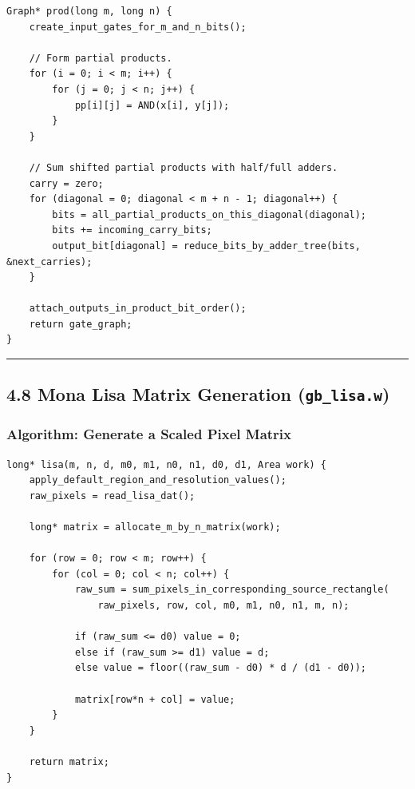 \documentclass[11pt]{article}
\begin{document}
\begin{verbatim}
Graph* prod(long m, long n) {
    create_input_gates_for_m_and_n_bits();

    // Form partial products.
    for (i = 0; i < m; i++) {
        for (j = 0; j < n; j++) {
            pp[i][j] = AND(x[i], y[j]);
        }
    }

    // Sum shifted partial products with half/full adders.
    carry = zero;
    for (diagonal = 0; diagonal < m + n - 1; diagonal++) {
        bits = all_partial_products_on_this_diagonal(diagonal);
        bits += incoming_carry_bits;
        output_bit[diagonal] = reduce_bits_by_adder_tree(bits, &next_carries);
    }

    attach_outputs_in_product_bit_order();
    return gate_graph;
}
\end{verbatim}

\begin{center}\rule{0.5\linewidth}{0.5pt}\end{center}

\subsection{\texorpdfstring{4.8 Mona Lisa Matrix Generation (\texttt{gb\_lisa.w})}{4.8 Mona Lisa Matrix Generation (gb\_lisa.w)}}\label{mona-lisa-matrix-generation-gb_lisa.w}

\subsubsection{Algorithm: Generate a Scaled Pixel Matrix}\label{algorithm-generate-a-scaled-pixel-matrix}

\begin{verbatim}
long* lisa(m, n, d, m0, m1, n0, n1, d0, d1, Area work) {
    apply_default_region_and_resolution_values();
    raw_pixels = read_lisa_dat();

    long* matrix = allocate_m_by_n_matrix(work);

    for (row = 0; row < m; row++) {
        for (col = 0; col < n; col++) {
            raw_sum = sum_pixels_in_corresponding_source_rectangle(
                raw_pixels, row, col, m0, m1, n0, n1, m, n);

            if (raw_sum <= d0) value = 0;
            else if (raw_sum >= d1) value = d;
            else value = floor((raw_sum - d0) * d / (d1 - d0));

            matrix[row*n + col] = value;
        }
    }

    return matrix;
}
\end{verbatim}
\end{document}
